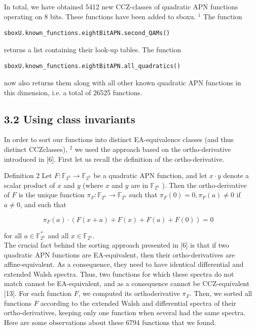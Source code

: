 \documentclass[10pt]{article}
\begin{document}
In total, we have obtained 5412 new CCZ-classes of quadratic APN functions operating on 8 bits. These functions have been added to sboxu. ${ }^{1}$ The function

\begin{verbatim}
sboxU.known_functions.eightBitAPN.second_QAMs()
\end{verbatim}

returns a list containing their look-up tables. The function

\begin{verbatim}
sboxU.known_functions.eightBitAPN.all_quadratics()
\end{verbatim}

now also returns them along with all other known quadratic APN functions in this dimension, i.e. a total of 26525 functions.

\subsection*{3.2 Using class invariants}
In order to sort our functions into distinct EA-equivalence classes (and thus distinct CCZclasses), ${ }^{2}$ we used the approach based on the ortho-derivative introduced in [6]. First let us recall the definition of the ortho-derivative.

Definition 2 Let $F: \mathbb{F}_{2^{n}} \rightarrow \mathbb{F}_{2^{n}}$ be a quadratic APN function, and let $x \cdot y$ denote a scalar product of $x$ and $y$ (where $x$ and $y$ are in $\mathbb{F}_{2^{n}}$ ). Then the ortho-derivative of $F$ is the unique function $\pi_{F}: \mathbb{F}_{2^{n}} \rightarrow \mathbb{F}_{2^{n}}$ such that $\pi_{F}(0)=0, \pi_{F}(a) \neq 0$ if $a \neq 0$, and such that

$$
\pi_{F}(a) \cdot(F(x+a)+F(x)+F(a)+F(0))=0
$$

for all $a \in \mathbb{F}_{2^{n}}^{*}$ and all $x \in \mathbb{F}_{2^{n}}$.\\[0pt]
The crucial fact behind the sorting approach presented in [6] is that if two quadratic APN functions are EA-equivalent, then their ortho-derivatives are affine-equivalent. As a consequence, they need to have identical differential and extended Walsh spectra. Thus, two functions for which these spectra do not match cannot be EA-equivalent, and as a consequence cannot be CCZ-equivalent [13]. For each function $F$, we computed its orthoderivative $\pi_{F}$. Then, we sorted all functions $F$ according to the extended Walsh and differential spectra of their ortho-derivatives, keeping only one function when several had the same spectra. Here are some observations about these 6794 functions that we found.
\end{document}
